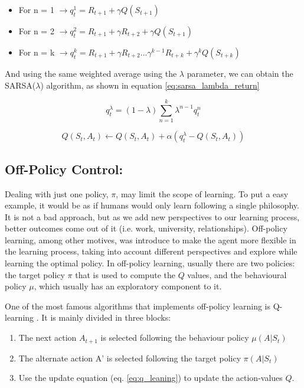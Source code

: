 \begin{itemize}
	\item For n = 1 $\rightarrow q^{1}_t = R_{t+1} + \gamma Q(S_{t+1})$
	\item For n = 2 $\rightarrow q^{2}_t = R_{t+1} + \gamma R_{t+2} + \gamma Q(S_{t+1})$
	\item For n = k $\rightarrow q^{k}_t = R_{t+1} + \gamma R_{t+2} ... \gamma^{k-1}R_{t+k} + \gamma^{k} Q(S_{t+k})$
\end{itemize}

And using the same weighted average using the $\lambda$ parameter, we can obtain the SARSA($\lambda$) algorithm, as shown in equation \ref{eq:sarsa_lambda_return}

\begin{equation}\label{eq:sarsa_lambda_return}
	q^{\lambda}_{t} = (1-\lambda)\sum_{n=1}^{k} \lambda^{n-1}q^{n}_{t}
\end{equation}

\begin{equation} \label{eq:sarsa_lambda}
	{Q}(S_t,A_t) \leftarrow {Q}(S_t,A_t) + \alpha(q^{\lambda}_{t} - {Q}(S_t,A_t))
\end{equation}

\subsection{Off-Policy Control: } \label{app:on_policy_control}

Dealing with just one policy, $\pi$, may limit the scope of learning. To put a easy example, it would be as if humans would only learn following a single philosophy. It is not a bad approach, but as we add new perspectives to our learning process, better outcomes come out of it (i.e. work, university, relationships). Off-policy learning, among other motives, was introduce to make the agent more flexible in the learning process, taking into account different perspectives and explore while learning the optimal policy. In off-policy learning, usually there are two policies: the target policy $\pi$ that is used to compute the ${Q}$ values, and the behavioural policy $\mu$, which usually has an exploratory component to it.

One of the most famous algorithms that implements off-policy learning is Q-learning \cite{Watkins1992}. It is mainly divided in three blocks:

\begin{enumerate}
	\item The next action $A_{t+1}$ is selected following the behaviour policy $\mu(A|S_t)$
	\item The alternate action A' is selected following the target policy $\pi(A|S_t)$
	\item Use the update equation (eq. \ref{eq:q_leaning}) to update the action-values ${Q}$.
\end{enumerate}


